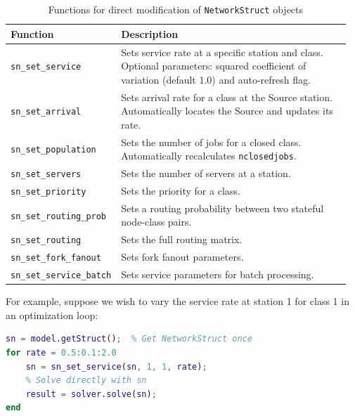 \begin{table}[t!]
\renewcommand{\arraystretch}{1.2}
\centering
\caption{Functions for direct modification of \texttt{NetworkStruct} objects}
\label{tab:sn-set-apis}
{\small
\begin{tabular}{|p{0.28\linewidth}|p{0.68\linewidth}|}
\hline
\textbf{Function} & \textbf{Description} \\
\hline
\texttt{sn\_set\_service} & Sets service rate at a specific station and class. Optional parameters: squared coefficient of variation (default 1.0) and auto-refresh flag. \\
\hline
\texttt{sn\_set\_arrival} & Sets arrival rate for a class at the Source station. Automatically locates the Source and updates its rate. \\
\hline
\texttt{sn\_set\_population} & Sets the number of jobs for a closed class. Automatically recalculates \texttt{nclosedjobs}. \\
\hline
\texttt{sn\_set\_servers} & Sets the number of servers at a station. \\
\hline
\texttt{sn\_set\_priority} & Sets the priority for a class. \\
\hline
\texttt{sn\_set\_routing\_prob} & Sets a routing probability between two stateful node-class pairs. \\
\hline
\texttt{sn\_set\_routing} & Sets the full routing matrix. \\
\hline
\texttt{sn\_set\_fork\_fanout} & Sets fork fanout parameters. \\
\hline
\texttt{sn\_set\_service\_batch} & Sets service parameters for batch processing. \\
\hline
\end{tabular}
}
\end{table}

For example, suppose we wish to vary the service rate at station 1 for class 1 in an optimization loop:
\begin{MATLAB}
\begin{lstlisting}[language = matlab]
sn = model.getStruct();  % Get NetworkStruct once
for rate = 0.5:0.1:2.0
    sn = sn_set_service(sn, 1, 1, rate);
    % Solve directly with sn
    result = solver.solve(sn);
end
\end{lstlisting}
\end{MATLAB}

